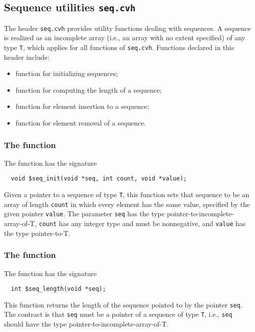 \subsection{Sequence utilities \texttt{seq.cvh}}
\label{subsec:seqLibrary}
The header \texttt{seq.cvh} provides utility functions dealing with sequences. A sequence is realized as an incomplete array (i.e., an array with no extent specified) of any type \texttt{T}, which applies for all functions of \texttt{seq.cvh}. Functions declared in this header include:
\begin{itemize}
\item function \cseqinit{} for initializing sequences;
\item function \cseqlen{} for computing the length of a sequence;
\item function \cseqinsert{} for element insertion to a sequence;
\item function \cseqrm{} for element removal of a sequence.
\end{itemize}

\subsubsection{The \cseqinit{} function}

The \cseqinit{} function has the signature
\begin{verbatim}
  void $seq_init(void *seq, int count, void *value);
\end{verbatim}

Given a pointer to a sequence of type \texttt{T}, this function sets that sequence to be an array of length \texttt{count} in which every element has the same value, specified by the given pointer \texttt{value}. The parameter \texttt{seq} has the type pointer-to-incomplete-array-of-T, \texttt{count} has any integer type and must be nonnegative, and \texttt{value} has the type pointer-to-T.

\subsubsection{The \cseqlen{} function}
The \cseqlen{} function has the signature
\begin{verbatim}
  int $seq_length(void *seq);
\end{verbatim}
This function returns the length of the sequence pointed to by the pointer \texttt{seq}. The contract is that \texttt{seq} must be a pointer of a sequence of type \texttt{T}, i.e., \texttt{seq} should have the type pointer-to-incomplete-array-of-T.

